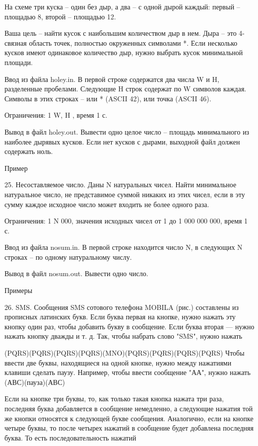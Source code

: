 \documentclass[]{article}
\begin{document}
На схеме три куска – один без дыр, а два – с одной дырой каждый: первый – площадью 8, второй – площадью 12.

Ваша цель – найти кусок с наибольшим количеством дыр в нем. Дыра – это 4-связная область точек, полностью окруженных символами *. Если несколько кусков имеют одинаковое количество дыр, нужно выбрать кусок минимальной площади.

Ввод из файла holey.in. В первой строке содержатся два числа W и H, разделенные пробелами. Следующие H строк содержат по W символов каждая. Символы в этих строках – или * (ASCII 42), или точка (ASCII 46).

Ограничения: 1 \leq W, H , время 1 с.

Вывод в файл holey.out. Вывести одно целое число – площадь минимального из наиболее дырявых кусков. Если нет кусков с дырами, выходной файл должен содержать ноль.

Пример



25. Несоставляемое число. Даны N натуральных чисел. Найти минимальное натуральное число, не представимое суммой никаких из этих чисел, если в эту сумму каждое исходное число может входить не более одного раза.

Ограничения: 1 \leq N  000, значения исходных чисел от 1 до 1 000 000 000, время 1 с.

Ввод из файла nosum.in. В первой строке находится число N, в следующих N строках – по одному натуральному числу.

Вывод в файл nosum.out. Вывести одно число.

Примеры



26. SMS. Сообщения SMS сотового телефона MOBILA (рис.) составлены из прописных латинских букв. Если буква первая на кнопке, нужно нажать эту кнопку один раз, чтобы добавить букву в сообщение. Если буква вторая — нужно нажать кнопку дважды и т. д. Так, чтобы набрать слово "SMS", нужно нажать

(PQRS)(PQRS)(PQRS)(PQRS)(MNO)(PQRS)(PQRS)(PQRS)(PQRS)
Чтобы ввести две буквы, находящиеся на одной кнопке, нужно между нажатиями клавиши сделать паузу. Например, чтобы ввести сообщение "АА", нужно нажать (АВС)(пауза)(АВС)

Если на кнопке три буквы, то, как только такая кнопка нажата три раза, последняя буква добавляется в сообщение немедленно, а следующие нажатия той же кнопки относятся к следующей букве сообщения. Аналогично, если на кнопке четыре буквы, то после четырех нажатий в сообщение будет добавлена последняя буква. То есть последовательность нажатий
\end{document}
